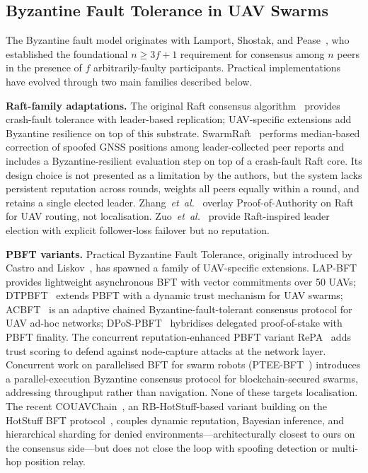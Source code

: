 \documentclass[journal,10pt,twocolumn]{IEEEtran}
\begin{document}
\subsection{Byzantine Fault Tolerance in UAV Swarms}

The Byzantine fault model originates with Lamport, Shostak, and Pease~\cite{lamport1982byzantine}, who established the foundational $n \geq 3f+1$ requirement for consensus among $n$ peers in the presence of $f$ arbitrarily-faulty participants. Practical implementations have evolved through two main families described below.

\textbf{Raft-family adaptations.} The original Raft consensus algorithm~\cite{ongaro2014raft} provides crash-fault tolerance with leader-based replication; UAV-specific extensions add Byzantine resilience on top of this substrate. SwarmRaft~\cite{dev2025swarmraft} performs median-based correction of spoofed GNSS positions among leader-collected peer reports and includes a Byzantine-resilient evaluation step on top of a crash-fault Raft core. Its design choice is not presented as a limitation by the authors, but the system lacks persistent reputation across rounds, weights all peers equally within a round, and retains a single elected leader. Zhang~\emph{et~al.}~\cite{zhang2024reputation} overlay Proof-of-Authority on Raft for UAV routing, not localisation. Zuo~\emph{et~al.}~\cite{zuo2022voting} provide Raft-inspired leader election with explicit follower-loss failover but no reputation.

\textbf{PBFT variants.} Practical Byzantine Fault Tolerance, originally introduced by Castro and Liskov~\cite{castro1999pbft}, has spawned a family of UAV-specific extensions. LAP-BFT~\cite{kong2022lapbft} provides lightweight asynchronous BFT with vector commitments over 50 UAVs; DTPBFT~\cite{han2024dtpbft} extends PBFT with a dynamic trust mechanism for UAV swarms; ACBFT~\cite{wang2025acbft} is an adaptive chained Byzantine-fault-tolerant consensus protocol for UAV ad-hoc networks; DPoS-PBFT~\cite{hafeez2024dposbft} hybridises delegated proof-of-stake with PBFT finality. The concurrent reputation-enhanced PBFT variant RePA~\cite{repa2025iot} adds trust scoring to defend against node-capture attacks at the network layer. Concurrent work on parallelised BFT for swarm robots (PTEE-BFT~\cite{wang2025pteebft}) introduces a parallel-execution Byzantine consensus protocol for blockchain-secured swarms, addressing throughput rather than navigation. None of these targets localisation. The recent COUAVChain~\cite{couavchain2025}, an RB-HotStuff-based variant building on the HotStuff BFT protocol~\cite{yin2019hotstuff}, couples dynamic reputation, Bayesian inference, and hierarchical sharding for denied environments---architecturally closest to ours on the consensus side---but does not close the loop with spoofing detection or multi-hop position relay.
\end{document}
